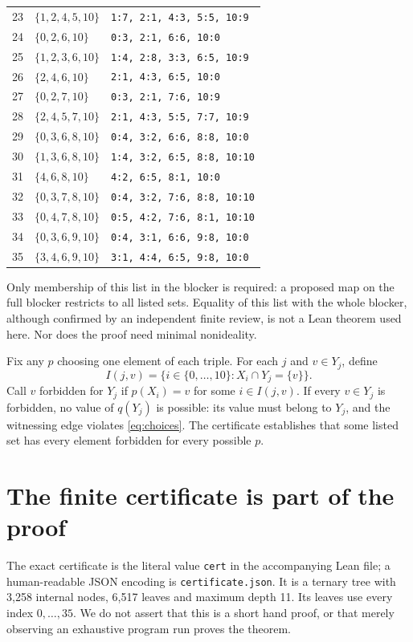 \documentclass[11pt]{article}
\begin{document}
\begin{longtable}{rll}
23 & $\{1,2,4,5,10\}$ & \texttt{1:7, 2:1, 4:3, 5:5, 10:9} \\
24 & $\{0,2,6,10\}$ & \texttt{0:3, 2:1, 6:6, 10:0} \\
25 & $\{1,2,3,6,10\}$ & \texttt{1:4, 2:8, 3:3, 6:5, 10:9} \\
26 & $\{2,4,6,10\}$ & \texttt{2:1, 4:3, 6:5, 10:0} \\
27 & $\{0,2,7,10\}$ & \texttt{0:3, 2:1, 7:6, 10:9} \\
28 & $\{2,4,5,7,10\}$ & \texttt{2:1, 4:3, 5:5, 7:7, 10:9} \\
29 & $\{0,3,6,8,10\}$ & \texttt{0:4, 3:2, 6:6, 8:8, 10:0} \\
30 & $\{1,3,6,8,10\}$ & \texttt{1:4, 3:2, 6:5, 8:8, 10:10} \\
31 & $\{4,6,8,10\}$ & \texttt{4:2, 6:5, 8:1, 10:0} \\
32 & $\{0,3,7,8,10\}$ & \texttt{0:4, 3:2, 7:6, 8:8, 10:10} \\
33 & $\{0,4,7,8,10\}$ & \texttt{0:5, 4:2, 7:6, 8:1, 10:10} \\
34 & $\{0,3,6,9,10\}$ & \texttt{0:4, 3:1, 6:6, 9:8, 10:0} \\
35 & $\{3,4,6,9,10\}$ & \texttt{3:1, 4:4, 6:5, 9:8, 10:0} \\
\bottomrule\end{longtable}

Only membership of this list in the blocker is required: a proposed map on the full blocker restricts to all listed sets. Equality of this list with the whole blocker, although confirmed by an independent finite review, is not a Lean theorem used here. Nor does the proof need minimal nonideality.

Fix any $p$ choosing one element of each triple. For each $j$ and $v\in Y_j$, define
\[
 I(j,v)=\{i\in\{0,\ldots,10\}:X_i\cap Y_j=\{v\}\}.
\]
Call $v$ forbidden for $Y_j$ if $p(X_i)=v$ for some $i\in I(j,v)$. If every $v\in Y_j$ is forbidden, no value of $q(Y_j)$ is possible: its value must belong to $Y_j$, and the witnessing edge violates \eqref{eq:choices}. The certificate establishes that some listed set has every element forbidden for every possible $p$.

\section{The finite certificate is part of the proof}
The exact certificate is the literal value \texttt{cert} in the accompanying Lean file; a human-readable JSON encoding is \texttt{certificate.json}. It is a ternary tree with 3,258 internal nodes, 6,517 leaves and maximum depth 11. Its leaves use every index $0,\ldots,35$. We do not assert that this is a short hand proof, or that merely observing an exhaustive program run proves the theorem.
\end{document}
